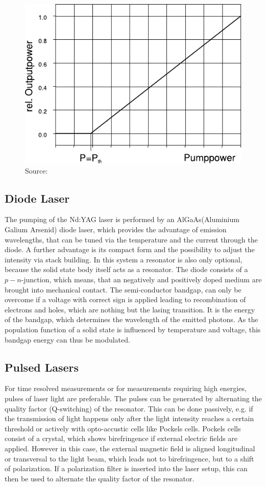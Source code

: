 \documentclass[a4paper]{scrartcl}
\numberwithin{equation}{section}
\numberwithin{figure}{section}
\numberwithin{table}{section}
\begin{document}
\begin{figure}
\centering
\includegraphics{img/threshold.pdf}
\caption{\small  Source: \cite{dickmann}}
\label{fig:threshold}
\end{figure}

\subsection{Diode Laser}
The pumping of the Nd:YAG laser is performed by an AlGaAs(Aluminium Galium Arsenid) diode laser, which provides the advantage of emission wavelengths, that can be tuned via the temperature and the  current through the diode. A further advantage is its compact form and the possibility to adjust the intensity via stack building. In this system a resonator is also only optional, because the solid state body itself acts as a resonator. The diode consists of a $p-n$-junction, which means, that an negatively and positively doped medium are brought into mechanical contact. The semi-conductor bandgap, can only be overcome if a voltage with correct sign is applied leading to recombination of electrons and holes, which are nothing but the lasing transition. It is the energy of the bandgap, which determines the wavelength of the emitted photons. As the population function of a solid state is influenced by temperature and voltage, this bandgap energy can thus be modulated.

\subsection{Pulsed Lasers}
For time resolved measurements or for measurements requiring high energies, pulses of laser light are preferable. The pulses can be generated by alternating the quality factor (Q-switching) of the resonator. This can be done passively, e.g. if the transmission of light happens only after the light intensity reaches a certain threshold or actively with opto-accustic cells like Pockels cells. Pockels cells consist of a crystal, which shows birefringence if external electric fields are applied. However in this case, the external magnetic field is aligned longitudinal or transversal to the light beam, which leads not to birefringence, but to a shift of polarization. If a polarization filter is inserted into the laser setup, this can then be used to alternate the quality factor of the resonator.
\end{document}
